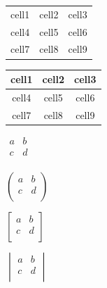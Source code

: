 \documentclass[12pt, letterpaper]{article}
\begin{document}
\begin{center}

\begin{tabular}{l c c} 

 cell1 & cell2 & cell3 \\ %
 cell4 & cell5 & cell6 \\  
 cell7 & cell8 & cell9    
\end{tabular}

\end{center}

\begin{center}
\begin{tabular}{|c|c|c|} 
 \hline %
 cell1 & cell2 & cell3 \\ 

\hline %
 cell4 & cell5 & cell6 \\ 
 cell7 & cell8 & cell9 \\ 
 \hline %
\end{tabular}
\end{center}



$\begin{matrix}
a & b \\
c & d \\
\end{matrix}$

$\begin{pmatrix}
a & b \\
c & d \\
\end{pmatrix}$

$\begin{bmatrix}
a & b \\
c & d \\
\end{bmatrix}$

$\begin{vmatrix}
a & b \\
c & d \\
\end{vmatrix}$

\end{document}
